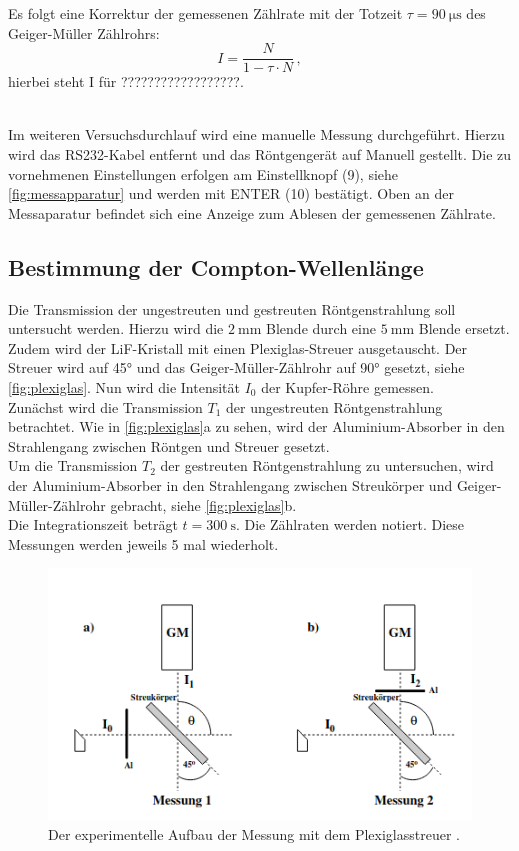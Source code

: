 Es folgt eine Korrektur der gemessenen Zählrate mit der Totzeit $\tau = \SI{90}{\micro\second}$ des Geiger-Müller Zählrohrs:
\begin{equation*}
    I = \frac{N}{1 - \tau \cdot N} \, ,
\end{equation*}
hierbei steht I für ??????????????????. %

\\
\noindent
Im weiteren Versuchsdurchlauf wird eine manuelle Messung durchgeführt.
Hierzu wird das RS232-Kabel entfernt und das Röntgengerät auf Manuell gestellt.
Die zu vornehmenen %
Einstellungen erfolgen am Einstellknopf (9), siehe \autoref{fig:messapparatur} und werden mit ENTER (10) bestätigt.
Oben an der Messaparatur befindet sich eine Anzeige zum Ablesen der gemessenen Zählrate.

\subsection{Bestimmung der Compton-Wellenlänge}
Die Transmission der ungestreuten und gestreuten Röntgenstrahlung soll untersucht werden.
Hierzu wird die $\SI{2}{\milli\metre}$ Blende durch eine $\SI{5}{\milli\metre}$ Blende ersetzt.
Zudem wird der LiF-Kristall mit einen Plexiglas-Streuer ausgetauscht.
Der Streuer wird auf 45° und das Geiger-Müller-Zählrohr auf 90° gesetzt, siehe \autoref{fig:plexiglas}.
Nun wird die Intensität $I_0$ der Kupfer-Röhre gemessen. \\
\noindent
Zunächst wird die Transmission $T_1$ der ungestreuten Röntgenstrahlung betrachtet.
Wie in \autoref{fig:plexiglas}a zu sehen, wird der Aluminium-Absorber in den Strahlengang zwischen Röntgen und Streuer gesetzt. \\
\noindent
Um die Transmission $T_2$ der gestreuten Röntgenstrahlung zu untersuchen, wird der Aluminium-Absorber in den Strahlengang zwischen Streukörper und Geiger-Müller-Zählrohr gebracht,
siehe \autoref{fig:plexiglas}b. \\
Die Integrationszeit beträgt $t = \SI{300}{\second}$.
Die Zählraten werden notiert.
Diese Messungen werden jeweils 5 mal wiederholt.

\begin{figure}
    \centering
    \includegraphics[width=\textwidth]{bilder/plexiglas_aufbau.png}
    \caption{Der experimentelle Aufbau der Messung mit dem Plexiglasstreuer \cite{anleitung}. }
    \label{fig:plexiglas}
\end{figure}